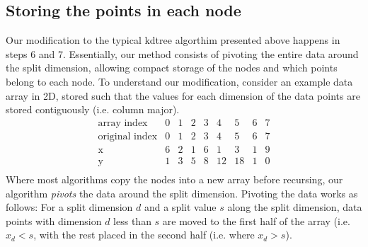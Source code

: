 \documentclass[journal]{IEEEtran}
\begin{document}
\subsection{Storing the points in each node}
Our modification to the typical kdtree algorthim presented above happens in
steps 6 and 7. Essentially, our method consists of pivoting the entire data
around the split dimension, allowing compact storage of the nodes and which
points belong to each node. To understand our modification, consider an example
data array in 2D, stored such that the values for each dimension of the data
points are stored contiguously (i.e. column major). %
\begin{equation*}
    \begin{array}{r||cccccccc}
    \textrm{array~index}     & 0 & 1 & 2 & 3 & 4  & 5  & 6 & 7 \\
    \textrm{original~index}  & 0 & 1 & 2 & 3 & 4  & 5  & 6 & 7 \\
    \textrm{x}               & 6 & 2 & 1 & 6 & 1  & 3  & 1 & 9 \\
    \textrm{y}               & 1 & 3 & 5 & 8 & 12 & 18 & 1 & 0 \\
    \end{array}
\end{equation*}
Where most algorithms copy the nodes into a new array before recursing, 
our algorithm {\em pivots} the data around the split dimension. Pivoting
the data works as follows: For a split dimension $d$ and a split value $s$
along the split dimension, data points with
dimension $d$ less than $s$ are moved to the first half of the array (i.e.
$x_d < s$, with the rest placed in the second half (i.e. where $x_d > s$).
\end{document}
